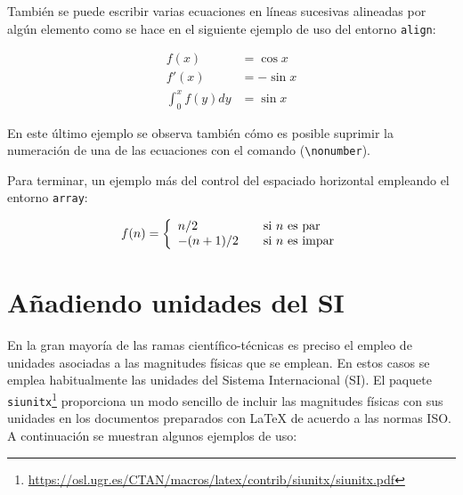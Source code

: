 \documentclass[11pt,a4paper]{article}
\begin{document}
También se puede escribir varias ecuaciones en líneas sucesivas alineadas por algún elemento como se hace en el siguiente ejemplo de uso del entorno \texttt{align}:

\begin{align}
f(x) & = \cos x \\
f'(x) & = -\sin x \\
\int_{0}^{x} f(y)dy & = \sin x \nonumber
\end{align}

\noindent En este último ejemplo se observa también cómo es posible suprimir la numeración de una de las ecuaciones con el comando (\texttt{\textbackslash nonumber}).

Para terminar, un ejemplo más del control del espaciado horizontal empleando el entorno \texttt{array}:

\[f(n) = \left\{ 
\begin{array}{l l}
  n/2 & \quad \mbox{si $n$ es par}\\
  -(n+1)/2 & \quad \mbox{si $n$ es impar}\\ \end{array} \right. \]


\section{Añadiendo unidades del SI}
En la gran mayoría de las ramas científico-técnicas es preciso el empleo de unidades asociadas a las magnitudes físicas que se emplean. En estos casos se emplea habitualmente las unidades del Sistema Internacional (SI). El paquete \texttt{siunitx}\footnote{\url{https://osl.ugr.es/CTAN/macros/latex/contrib/siunitx/siunitx.pdf}} proporciona un modo sencillo de incluir las magnitudes físicas con sus unidades en los documentos preparados con \LaTeX{} de acuerdo a las normas ISO. A continuación se muestran algunos ejemplos de uso:
\end{document}
